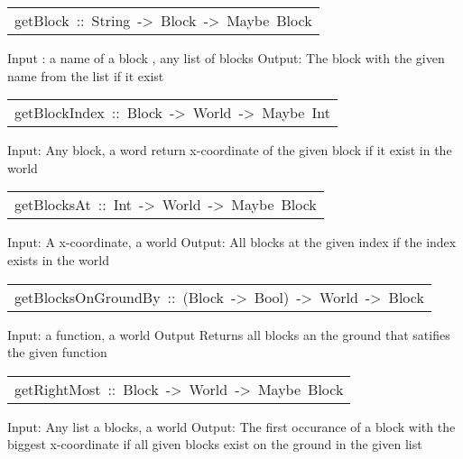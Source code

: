 \begin{haddockdesc}
\item[\begin{tabular}{@{}l}
getBlock\ ::\ String\ ->\ {\char 91}Block{\char 93}\ ->\ Maybe\ Block
\end{tabular}]\haddockbegindoc
Input : a name of a block , any list of blocks
  Output: The block with the given name from the list if it exist
\par

\end{haddockdesc}
\begin{haddockdesc}
\item[\begin{tabular}{@{}l}
getBlockIndex\ ::\ Block\ ->\ World\ ->\ Maybe\ Int
\end{tabular}]\haddockbegindoc
Input: Any block, a word
  return x-coordinate of the given block if it exist in the world
\par

\end{haddockdesc}
\begin{haddockdesc}
\item[\begin{tabular}{@{}l}
getBlocksAt\ ::\ Int\ ->\ World\ ->\ Maybe\ {\char 91}Block{\char 93}
\end{tabular}]\haddockbegindoc
Input:  A x-coordinate, a world 
  Output: All blocks at the given index if the index exists in the world
\par

\end{haddockdesc}
\begin{haddockdesc}
\item[\begin{tabular}{@{}l}
getBlocksOnGroundBy\ ::\ (Block\ ->\ Bool)\ ->\ World\ ->\ {\char 91}Block{\char 93}
\end{tabular}]\haddockbegindoc
Input: a function, a world
  Output Returns all blocks an the ground that satifies the given function 
\par

\end{haddockdesc}
\begin{haddockdesc}
\item[\begin{tabular}{@{}l}
getRightMost\ ::\ {\char 91}Block{\char 93}\ ->\ World\ ->\ Maybe\ Block
\end{tabular}]\haddockbegindoc
Input:  Any list a blocks, a world 
  Output: The first occurance of a block with the biggest x-coordinate 
        if all given blocks exist on the ground in the given list
\par

\end{haddockdesc}
